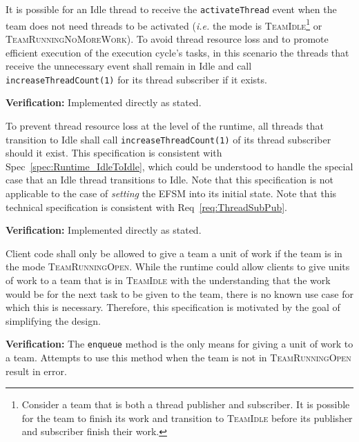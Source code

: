 \documentclass{article}
\newcommand{\TeamIdle}          {\textsc{TeamIdle}}
\newcommand{\TeamRunningOpen}   {\textsc{TeamRunningOpen}}
\newcommand{\TeamRunningNoMoreWork} {\textsc{TeamRunningNoMoreWork}}
\begin{document}
\begin{spec}
\label{spec:Runtime_IdleToIdle}
It is possible for an Idle thread to receive the \texttt{activateThread} event
when the team does not need threads to be activated (\textit{i.e.} the mode is
\TeamIdle \footnote{Consider a team that is both a thread publisher and
subscriber.  It is possible for the team to finish its work and transition to
{\TeamIdle} before its publisher and subscriber finish their work.} or
\TeamRunningNoMoreWork).  To avoid thread resource loss and to promote efficient
execution of the execution cycle's tasks, in this scenario the threads that
receive the unnecessary event shall remain in Idle and call
\texttt{increaseThreadCount(1)} for its thread subscriber if it exists.
\end{spec}
\textbf{Verification:}\hspace{0.125in} Implemented directly as stated.

\begin{spec}
\label{spec:Runtime_ForwardThreads}
To prevent thread resource loss at the level of the runtime, all threads that
transition to Idle shall call \texttt{increaseThreadCount(1)} of its thread
subscriber should it exist.  This specification is consistent with
Spec~\ref{spec:Runtime_IdleToIdle}, which could be understood to handle the
special case that an Idle thread transitions to Idle.  Note that this
specification is not applicable to the case of \textit{setting} the EFSM into
its initial state.  Note that this technical specification is consistent with
Req~\ref{req:ThreadSubPub}.
\end{spec}
\textbf{Verification:}\hspace{0.125in} Implemented directly as stated.

\begin{spec}
\label{spec:Runtime_NoEnqueue}
Client code shall only be allowed to give a team a unit of work if the team is
in the mode {\TeamRunningOpen}.  While the runtime could allow clients to give
units of work to a team that is in {\TeamIdle} with the understanding that the
work would be for the next task to be given to the team, there is no known use
case for which this is necessary.  Therefore, this specification is motivated by
the goal of simplifying the design.
\end{spec}
\textbf{Verification:}\hspace{0.125in}  The \texttt{enqueue} method is the only
means for giving a unit of work to a team.  Attempts to use this method when the
team is not in {\TeamRunningOpen} result in error.\\
\end{document}

